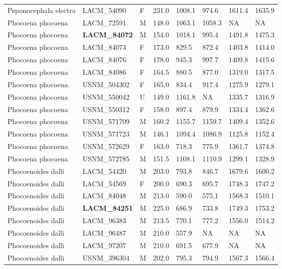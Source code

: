 \begin{longtable}{|p{1.95in}p{1.1in}p{.15in}p{.4in}p{.4in}p{.4in}p{.4in}p{.4in}|}
  Peponocephala electra & LACM\_54090 & F & 231.0 & 1008.1 & 974.6 & 1611.4 & 1635.9 \\ 
  Phocoena phocoena & LACM\_72591 & M & 148.0 & 1063.1 & 1058.3 & NA & NA  \\ 
  Phocoena phocoena & \textbf{ LACM\_84072 } & M & 154.0 & 1018.1 & 995.4 & 1491.8 & 1475.3 \\ 
  Phocoena phocoena & LACM\_84073 & F & 173.0 & 829.5 & 872.4 & 1403.8 & 1414.0 \\ 
  Phocoena phocoena & LACM\_84076 & F & 178.0 & 945.3 & 997.7 & 1409.8 & 1415.6 \\ 
  Phocoena phocoena & LACM\_84086 & F & 164.5 & 880.5 & 877.0 & 1319.0 & 1317.5 \\ 
  Phocoena phocoena & USNM\_504302 & F & 165.0 & 834.4 & 917.4 & 1275.9 & 1279.1 \\ 
  Phocoena phocoena & USNM\_550042 & U & 149.0 & 1161.8 & NA & 1335.7 & 1316.9 \\ 
  Phocoena phocoena & USNM\_550312 & F & 158.0 & 897.4 & 879.9 & 1334.4 & 1362.6 \\ 
  Phocoena phocoena & USNM\_571709 & M & 160.2 & 1155.7 & 1159.7 & 1409.4 & 1352.6 \\ 
  Phocoena phocoena & USNM\_571723 & M & 146.1 & 1094.4 & 1086.9 & 1125.8 & 1152.4 \\ 
  Phocoena phocoena & USNM\_572629 & F & 163.0 & 718.3 & 775.9 & 1361.7 & 1374.8 \\ 
  Phocoena phocoena & USNM\_572785 & M & 151.5 & 1108.1 & 1110.9 & 1299.1 & 1328.9 \\ 
  Phocoenoides dalli & LACM\_54420 & M & 203.0 & 793.8 & 846.7 & 1679.6 & 1600.2 \\ 
  Phocoenoides dalli & LACM\_54569 & F & 200.0 & 690.3 & 695.7 & 1748.3 & 1747.2 \\ 
  Phocoenoides dalli & LACM\_84048 & M & 213.0 & 590.0 & 575.1 & 1568.3 & 1510.1 \\ 
  Phocoenoides dalli & \textbf{ LACM\_84251 } & M & 225.0 & 686.9 & 733.8 & 1749.3 & 1753.2 \\ 
  Phocoenoides dalli & LACM\_96383 & M & 213.5 & 770.1 & 777.2 & 1556.0 & 1514.2 \\ 
  Phocoenoides dalli & LACM\_96487 & M & 210.0 & 557.9 & NA & NA & NA  \\ 
  Phocoenoides dalli & LACM\_97207 & M & 210.0 & 691.5 & 677.9 & NA &  NA \\ 
  Phocoenoides dalli & USNM\_396304 & M & 202.0 & 795.3 & 794.9 & 1567.3 & 1566.4 \\ 

\end{longtable}
